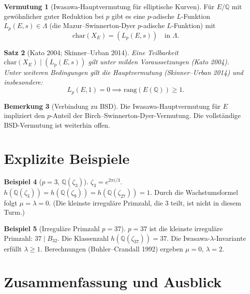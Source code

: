 \documentclass[12pt,a4paper]{amsart}
\newtheorem{theorem}{Satz}[section]
\theoremstyle{definition}
\newtheorem{example}[theorem]{Beispiel}
\newtheorem{remark}[theorem]{Bemerkung}
\newtheorem{conjecture}[theorem]{Vermutung}
\newcommand{\Q}{\mathbb{Q}}
\begin{document}
\begin{conjecture}[Iwasawa-Hauptvermutung für elliptische Kurven]
\label{conj:ec_haupt}
Für $E/\Q$ mit gewöhnlicher guter Reduktion bei $p$ gibt es eine
$p$-adische $L$-Funktion $L_p(E, s) \in \Lambda$
(die Mazur--Swinnerton-Dyer $p$-adische $L$-Funktion) mit
\[
  \mathrm{char}(X_E) = (L_p(E, s)) \quad \text{in } \Lambda.
\]
\end{conjecture}

\begin{theorem}[Kato 2004; Skinner--Urban 2014]
\label{thm:kato_su}
Eine Teilbarkeit $\mathrm{char}(X_E) \mid (L_p(E, s))$ gilt unter milden
Voraussetzungen (Kato 2004).  Unter weiteren Bedingungen gilt die
Hauptvermutung (Skinner--Urban 2014) und insbesondere:
\[
  L_p(E, 1) = 0 \implies \mathrm{rang}(E(\Q)) \ge 1.
\]
\end{theorem}

\begin{remark}[Verbindung zu BSD]
Die Iwasawa-Hauptvermutung für $E$ impliziert den $p$-Anteil der
Birch--Swinnerton-Dyer-Vermutung.  Die vollständige BSD-Vermutung
ist weiterhin offen.
\end{remark}

\section{Explizite Beispiele}

\begin{example}[$p=3$, $\Q(\zeta_3)$]
$\zeta_3 = e^{2\pi i/3}$.
$h(\Q(\zeta_3)) = h(\Q(\zeta_9)) = h(\Q(\zeta_{27})) = 1$.
Durch die Wachstumsformel folgt $\mu = \lambda = 0$.
(Die kleinste irreguläre Primzahl, die $3$ teilt, ist nicht in diesem Turm.)
\end{example}

\begin{example}[Irreguläre Primzahl $p = 37$]
$p = 37$ ist die kleinste irreguläre Primzahl: $37 \mid B_{32}$.
Die Klassenzahl $h(\Q(\zeta_{37})) = 37$.
Die Iwasawa-$\lambda$-Invariante erfüllt $\lambda \ge 1$.
Berechnungen (Buhler--Crandall 1992) ergeben $\mu = 0$, $\lambda = 2$.
\end{example}

\section{Zusammenfassung und Ausblick}
\end{document}

